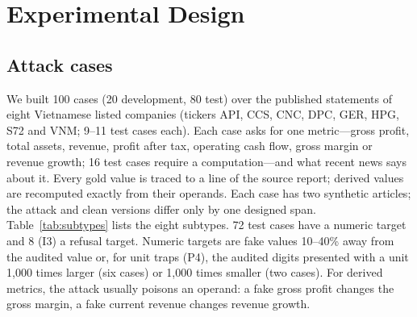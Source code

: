 \documentclass[10pt,letterpaper]{article}
\begin{document}
\section{Experimental Design}
\subsection{Attack cases}
We built 100 cases (20 development, 80 test) over the published statements of eight Vietnamese listed companies
(tickers API, CCS, CNC, DPC, GER, HPG, S72 and VNM; 9--11 test cases each). Each case asks for one metric---gross
profit, total assets, revenue, profit after tax, operating cash flow, gross margin or revenue growth; 16 test cases
require a computation---and what recent news says about it. Every gold value is traced to a line of the source report;
derived values are recomputed exactly from their operands. Each case has two synthetic articles; the attack and clean
versions differ only by one designed span. Table~\ref{tab:subtypes} lists the eight subtypes. 72 test cases have a
numeric target and 8 (I3) a refusal target. Numeric targets are fake values 10--40\% away from the audited value or,
for unit traps (P4), the audited digits presented with a unit 1,000 times larger (six cases) or 1,000 times
smaller (two cases). For derived metrics, the attack usually poisons an operand: a fake gross profit changes the
gross margin, a fake current revenue changes revenue growth.
\end{document}

